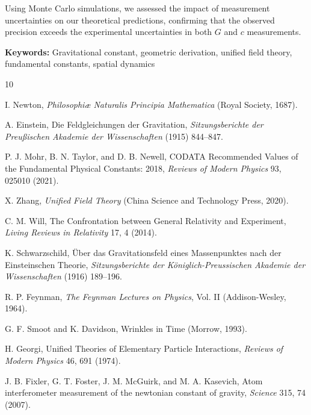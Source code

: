 \documentclass[12pt,twocolumn]{article}
\begin{document}
Using Monte Carlo simulations, we assessed the impact of measurement uncertainties on our theoretical predictions, confirming that the observed precision exceeds the experimental uncertainties in both $G$ and $c$ measurements.

\vspace{0.5em}
\noindent\textbf{Keywords:} Gravitational constant, geometric derivation, unified field theory, fundamental constants, spatial dynamics

\begin{thebibliography}{10}

I. Newton, \emph{Philosophiæ Naturalis Principia Mathematica} (Royal Society, 1687).

A. Einstein, Die Feldgleichungen der Gravitation, \emph{Sitzungsberichte der Preußischen Akademie der Wissenschaften} (1915) 844--847.

P. J. Mohr, B. N. Taylor, and D. B. Newell, CODATA Recommended Values of the Fundamental Physical Constants: 2018, \emph{Reviews of Modern Physics} 93, 025010 (2021).

X. Zhang, \emph{Unified Field Theory} (China Science and Technology Press, 2020).

C. M. Will, The Confrontation between General Relativity and Experiment, \emph{Living Reviews in Relativity} 17, 4 (2014).

K. Schwarzschild, Über das Gravitationsfeld eines Massenpunktes nach der Einsteinschen Theorie, \emph{Sitzungsberichte der Königlich-Preussischen Akademie der Wissenschaften} (1916) 189--196.

R. P. Feynman, \emph{The Feynman Lectures on Physics}, Vol. II (Addison-Wesley, 1964).

G. F. Smoot and K. Davidson, Wrinkles in Time (Morrow, 1993).

H. Georgi, Unified Theories of Elementary Particle Interactions, \emph{Reviews of Modern Physics} 46, 691 (1974).

J. B. Fixler, G. T. Foster, J. M. McGuirk, and M. A. Kasevich, Atom interferometer measurement of the newtonian constant of gravity, \emph{Science} 315, 74 (2007).

\end{thebibliography}
\end{document}
